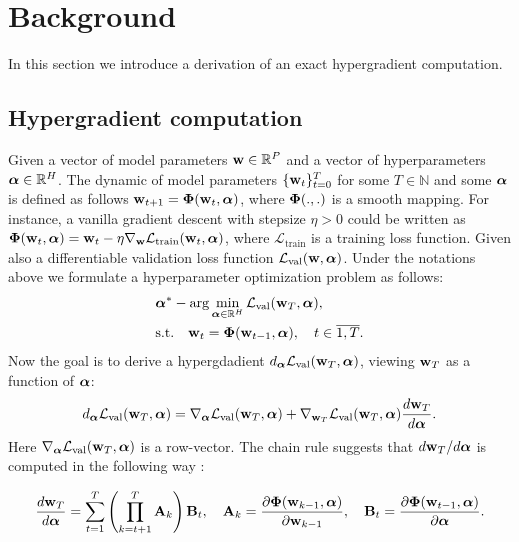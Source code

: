 \section{Background}
In this section we introduce a derivation of an exact hypergradient computation.

\subsection{Hypergradient computation}
Given a vector of model parameters $\boldsymbol{\mathbf{w}} \in \mathbb{R}^P$ and a vector of hyperparameters $\boldsymbol{\mathbf{\alpha}} \in \mathbb{R}^H$. The dynamic of model parameters $\{\boldsymbol{\mathbf{w}}_t\}_{t=0}^{T}$ for some $T \in \mathbb{N}$ and some $\boldsymbol{\mathbf{\alpha}}$ is defined as follows $\boldsymbol{\mathbf{w}}_{t+1} = \boldsymbol{\mathbf{\Phi}}(\boldsymbol{\mathbf{w}}_t, \boldsymbol{\mathbf{\alpha}})$, where $\boldsymbol{\mathbf{\Phi}}(., .)$ is a smooth mapping. For instance, a vanilla gradient descent with stepsize $\eta > 0$ could be written as $\boldsymbol{\mathbf{\Phi}}(\boldsymbol{\mathbf{w}}_t, \boldsymbol{\mathbf{\alpha}}) = \boldsymbol{\mathbf{w}}_t - \eta\nabla_{\boldsymbol{\mathbf{w}}}\mathcal{L}_\text{train}(\boldsymbol{\mathbf{w}}_t, \boldsymbol{\mathbf{\alpha}})$, where $\mathcal{L}_\text{train}$ is a training loss function. Given also a differentiable validation loss function $\mathcal{L}_\text{val}(\boldsymbol{\mathbf{w}}, \boldsymbol{\mathbf{\alpha}})$. Under the notations above we formulate a hyperparameter optimization problem as follows:
\begin{align}
    &\boldsymbol{\mathbf{\alpha}}^* - \arg\min_{\boldsymbol{\mathbf{\alpha}} \in \mathbb{R}^H}\mathcal{L}_\text{val}(\boldsymbol{\mathbf{w}}_T, \boldsymbol{\mathbf{\alpha}}),\\
    &\mathrm{s.t.} \quad \boldsymbol{\mathbf{w}}_{t} = \boldsymbol{\mathbf{\Phi}}(\boldsymbol{\mathbf{w}}_{t-1}, \boldsymbol{\mathbf{\alpha}}), \quad t \in \overline{1, T}.
\end{align}
Now the goal is to derive a hypergdadient $d_{\boldsymbol{\mathbf{\alpha}}}\mathcal{L}_\text{val}(\boldsymbol{\mathbf{w}}_T, \boldsymbol{\mathbf{\alpha}})$, viewing $\boldsymbol{\mathbf{w}}_T$ as a function of $\boldsymbol{\mathbf{\alpha}}$:
\begin{align}
    d_{\boldsymbol{\mathbf{\alpha}}}\mathcal{L}_\text{val}(\boldsymbol{\mathbf{w}}_T, \boldsymbol{\mathbf{\alpha}}) = \nabla_{\boldsymbol{\mathbf{\alpha}}}\mathcal{L}_\text{val}(\boldsymbol{\mathbf{w}}_T, \boldsymbol{\mathbf{\alpha}}) + \nabla_{\boldsymbol{\mathbf{w}}_T}\mathcal{L}_\text{val}(\boldsymbol{\mathbf{w}}_T, \boldsymbol{\mathbf{\alpha}})\frac{d\boldsymbol{\mathbf{w}}_T}{d\boldsymbol{\mathbf{\alpha}}}.
\end{align}
Here $\nabla_{\boldsymbol{\mathbf{\alpha}}}\mathcal{L}_\text{val}(\boldsymbol{\mathbf{w}}_T, \boldsymbol{\mathbf{\alpha}})$ is a row-vector.
The chain rule suggests that $d\boldsymbol{\mathbf{w}}_T/d\boldsymbol{\mathbf{\alpha}}$ is computed in the following way \cite{franceschi2017forward}:

\begin{align}\label{eq:exact_dw_da}
    \frac{d\boldsymbol{\mathbf{w}}_T}{d\boldsymbol{\mathbf{\alpha}}} = \sum_{t=1}^T\left(\prod_{k=t+1}^T\boldsymbol{\mathbf{A}}_k\right)\boldsymbol{\mathbf{B}}_t, \quad \boldsymbol{\mathbf{A}}_k = \frac{\partial\boldsymbol{\mathbf{\Phi}}(\boldsymbol{\mathbf{w}}_{k-1}, \boldsymbol{\mathbf{\alpha}})}{\partial\boldsymbol{\mathbf{w}}_{k-1}}, \quad \boldsymbol{\mathbf{B}}_t = \frac{\partial\boldsymbol{\mathbf{\Phi}}(\boldsymbol{\mathbf{w}}_{t-1}, \boldsymbol{\mathbf{\alpha}})}{\partial\boldsymbol{\mathbf{\alpha}}}.
\end{align}

